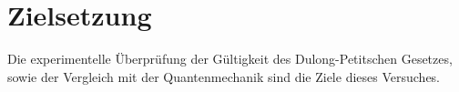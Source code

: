 \section{Zielsetzung}
\label{sec:Ziel}
Die experimentelle Überprüfung der Gültigkeit des Dulong-Petitschen Gesetzes,
sowie der Vergleich mit der Quantenmechanik sind die Ziele dieses Versuches.
